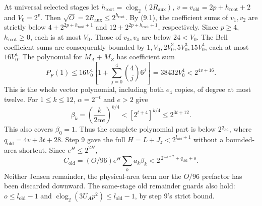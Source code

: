 \documentclass[11pt]{article}
\theoremstyle{plain}
\theoremstyle{definition}
\theoremstyle{remark}
\begin{document}
At universal selected stages let
$h_{\mathrm{root}}=\operatorname{clog}_2(2R_{\mathrm{aux}})$,
$v=v_{\mathrm{old}}=2p+h_{\mathrm{root}}+2$ and $V_0=2^v$.
Then $\sqrt O=2R_{\mathrm{aux}}\le2^{h_{\mathrm{root}}}$.
By (9.1), the coefficient sums of $v_1,v_2$ are strictly below
$4+2^{2p+h_{\mathrm{root}}+1}$ and $12+2^{2p+h_{\mathrm{root}}+1}$,
respectively. Since $p\ge4$, $h_{\mathrm{root}}\ge0$, each is at most
$V_0$. Those of $v_3,v_4$ are below $24<V_0$.
The Bell coefficient sums are consequently bounded by
$1,V_0,2V_0^2,5V_0^3,15V_0^4$, each at most $16V_0^4$.
The polynomial for $M_A+M_Z$ has coefficient sum
\begin{equation}
 P_{\overline F}(1)\le16V_0^4
 \left[1+\sum_{j=0}^4\binom4j6^j\right]
 =38432V_0^4<2^{4v+16}.\tag{11.4}
\end{equation}
This is the whole vector polynomial, including both $e_4$ copies, of
degree at most twelve. For $1\le k\le12$, $\alpha=2^{-t}$ and $e>2$ give
\[
 \beta_k=\left(\frac{k}{2\alpha e}\right)^{k/4}
 <[2^{t+4}]^{k/4}\le2^{3t+12}.
\]
This also covers $\beta_0=1$. Thus the complete polynomial part is below
$2^{q_{\mathrm{old}}}$, where $q_{\mathrm{old}}=4v+3t+28$.
Step 9 gave the full $H=L+J_z<2^{l_{\mathrm{old}}+1}$ without a bounded-area
shortcut. Since $e^H\le2^{2H}$,
\begin{equation}
 C_{\mathrm{old}}=(O/96)e^H\sum_k a_k\beta_k
 <2^{\,2^{l_{\mathrm{old}}+2}+q_{\mathrm{old}}+o}.\tag{11.5}
\end{equation}
Neither Jensen remainder, the physical-area term nor the $O/96$ prefactor
has been discarded downward. The same-stage old remainder guards also
hold: $o\le l_{\mathrm{old}}-1$ and
$\operatorname{clog}_2(3U_Ap^2)\le l_{\mathrm{old}}-1$, by step 9's strict bound.
\end{document}
